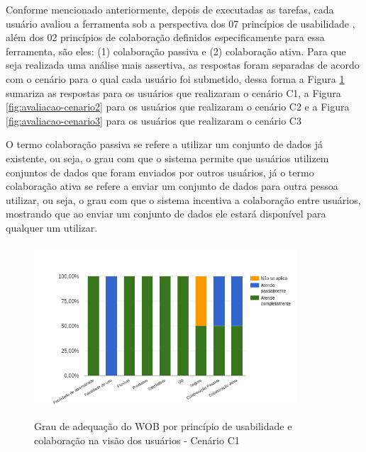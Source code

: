 Conforme mencionado anteriormente, depois de executadas as tarefas, cada usuário avaliou a 
ferramenta sob a perspectiva dos 07 princípios de usabilidade \cite{nielsen1994usability}, 
além dos 02 princípios de colaboração definidos especificamente para essa ferramenta, são 
eles: (1) colaboração passiva e (2) colaboração ativa. Para que seja realizada uma análise 
mais assertiva, as respostas foram separadas de acordo com o cenário para o qual cada usuário 
foi submetido, dessa forma a Figura \ref{fig:avaliacao-cenario1} sumariza as respostas para os 
usuários que realizaram o cenário C1, a Figura \ref{fig:avaliacao-cenario2} para os usuários 
que realizaram o cenário C2 e a Figura \ref{fig:avaliacao-cenario3} para os usuários que 
realizaram o cenário C3

O termo colaboração passiva se refere a utilizar um conjunto de dados já existente, ou 
seja, o grau com que o sistema permite que usuários utilizem conjuntos de dados que foram 
enviados por outros usuários, já o termo colaboração ativa se refere a enviar um conjunto 
de dados para outra pessoa utilizar, ou seja, o grau com que o sistema incentiva a 
colaboração entre usuários, mostrando que ao enviar um conjunto de dados ele estará 
disponível para qualquer um utilizar. 

\begin{figure}[!htb]
    \centering
    \caption{Grau de adequação do WOB por princípio de usabilidade e colaboração na visão dos usuários - Cenário C1}
    \includegraphics[width=0.87\textwidth]{./04-figuras/avaliacao-cenario1}
    \label{fig:avaliacao-cenario1}
\end{figure}

